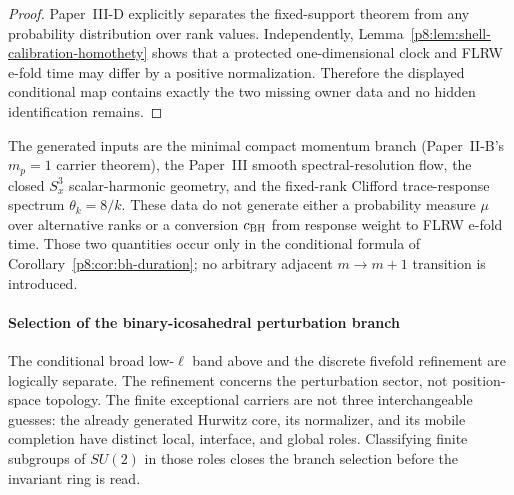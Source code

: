 \documentclass[12pt,a4paper]{article}
\begin{document}
\begin{proof}
Paper~III-D explicitly separates the fixed-support theorem from any
probability distribution over rank values.  Independently,
Lemma~\ref{p8:lem:shell-calibration-homothety} shows that a protected
one-dimensional clock and FLRW e-fold time may differ by a positive
normalization.  Therefore the displayed conditional map contains exactly the
two missing owner data and no hidden identification remains.
\end{proof}

\begin{remark}
\leavevmode\par\noindent
The generated inputs are the minimal compact momentum branch
(Paper~II-B's \(m_p=1\) carrier theorem), the Paper~III smooth
spectral-resolution flow, the closed \(S^3_x\) scalar-harmonic geometry, and
the fixed-rank Clifford trace-response spectrum \(\theta_k=8/k\).  These data
do not generate either a probability measure \(\mu\) over alternative ranks
or a conversion \(c_{\rm BH}\) from response weight to FLRW e-fold time.
Those two quantities occur only in the conditional formula of
Corollary~\ref{p8:cor:bh-duration}; no arbitrary adjacent \(m\to m+1\)
transition is introduced.
\end{remark}

\paragraph{Selection of the binary-icosahedral perturbation branch}
\label{p8:subsec:bh-2I-refinement}

The conditional broad low-\(\ell\) band above and the discrete fivefold
refinement are logically separate.  The refinement concerns the perturbation
sector, not position-space topology.  The finite exceptional carriers are not
three interchangeable guesses: the already generated Hurwitz core, its
normalizer, and its mobile completion have distinct local, interface, and
global roles.  Classifying finite subgroups of \(SU(2)\) in those roles closes
the branch selection before the invariant ring is read.
\end{document}
